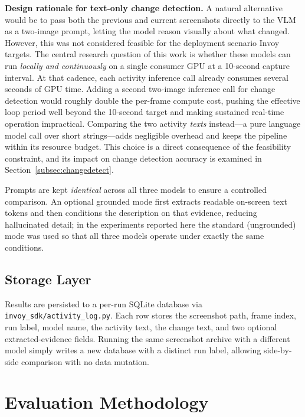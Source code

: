 \documentclass[10pt, twocolumn]{article}
\begin{document}
\noindent
\textbf{Design rationale for text-only change detection.}
A natural alternative would be to pass both the previous and current screenshots
directly to the VLM as a two-image prompt, letting the model reason visually
about what changed. However, this was not considered feasible for the deployment
scenario Invoy targets. The central research question of this work is whether
these models can run \emph{locally and continuously} on a single consumer GPU at a
10-second capture interval. At that cadence, each activity inference call already
consumes several seconds of GPU time. Adding a second two-image inference call for
change detection would roughly double the per-frame compute cost, pushing the
effective loop period well beyond the 10-second target and making sustained
real-time operation impractical. Comparing the two activity \emph{texts}
instead---a pure language model call over short strings---adds negligible overhead
and keeps the pipeline within its resource budget. This choice is a direct
consequence of the feasibility constraint, and its impact on change detection
accuracy is examined in Section~\ref{subsec:changedetect}.

Prompts are kept \emph{identical} across all three models to ensure a controlled
comparison. An optional grounded mode first extracts readable on-screen text tokens
and then conditions the description on that evidence, reducing hallucinated detail;
in the experiments reported here the standard (ungrounded) mode was used so that
all three models operate under exactly the same conditions.

\subsection{Storage Layer}

Results are persisted to a per-run SQLite database via \texttt{invoy\_sdk/activity\_log.py}.
Each row stores the screenshot path, frame index, run label, model name, the activity
text, the change text, and two optional extracted-evidence fields. Running the same
screenshot archive with a different model simply writes a new database with a distinct
run label, allowing side-by-side comparison with no data mutation.

\section{Evaluation Methodology}
\label{sec:eval}
\end{document}
